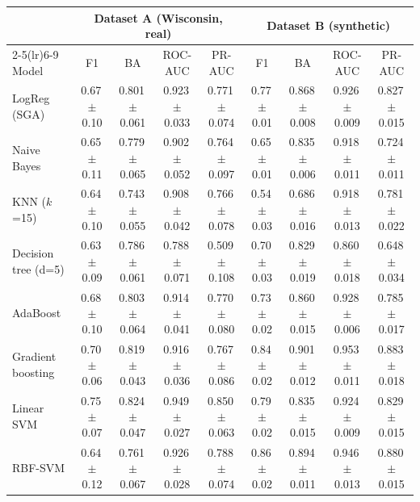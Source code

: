 \begin{tabular}{lcccccccc}\toprule
 & \multicolumn{4}{c}{Dataset A (Wisconsin, real)} & \multicolumn{4}{c}{Dataset B (synthetic)}\\
\cmidrule(lr){2-5}\cmidrule(lr){6-9}
Model & F1 & BA & ROC-AUC & PR-AUC & F1 & BA & ROC-AUC & PR-AUC\\\midrule
LogReg (SGA) & 0.67\,{\scriptsize$\pm$0.10} & 0.801\,{\scriptsize$\pm$0.061} & 0.923\,{\scriptsize$\pm$0.033} & 0.771\,{\scriptsize$\pm$0.074} & 0.77\,{\scriptsize$\pm$0.01} & 0.868\,{\scriptsize$\pm$0.008} & 0.926\,{\scriptsize$\pm$0.009} & 0.827\,{\scriptsize$\pm$0.015}\\
Naive Bayes & 0.65\,{\scriptsize$\pm$0.11} & 0.779\,{\scriptsize$\pm$0.065} & 0.902\,{\scriptsize$\pm$0.052} & 0.764\,{\scriptsize$\pm$0.097} & 0.65\,{\scriptsize$\pm$0.01} & 0.835\,{\scriptsize$\pm$0.006} & 0.918\,{\scriptsize$\pm$0.011} & 0.724\,{\scriptsize$\pm$0.011}\\
KNN ($k$=15) & 0.64\,{\scriptsize$\pm$0.10} & 0.743\,{\scriptsize$\pm$0.055} & 0.908\,{\scriptsize$\pm$0.042} & 0.766\,{\scriptsize$\pm$0.078} & 0.54\,{\scriptsize$\pm$0.03} & 0.686\,{\scriptsize$\pm$0.016} & 0.918\,{\scriptsize$\pm$0.013} & 0.781\,{\scriptsize$\pm$0.022}\\
Decision tree (d=5) & 0.63\,{\scriptsize$\pm$0.09} & 0.786\,{\scriptsize$\pm$0.061} & 0.788\,{\scriptsize$\pm$0.071} & 0.509\,{\scriptsize$\pm$0.108} & 0.70\,{\scriptsize$\pm$0.03} & 0.829\,{\scriptsize$\pm$0.019} & 0.860\,{\scriptsize$\pm$0.018} & 0.648\,{\scriptsize$\pm$0.034}\\
AdaBoost & 0.68\,{\scriptsize$\pm$0.10} & 0.803\,{\scriptsize$\pm$0.064} & 0.914\,{\scriptsize$\pm$0.041} & 0.770\,{\scriptsize$\pm$0.080} & 0.73\,{\scriptsize$\pm$0.02} & 0.860\,{\scriptsize$\pm$0.015} & 0.928\,{\scriptsize$\pm$0.006} & 0.785\,{\scriptsize$\pm$0.017}\\
Gradient boosting & 0.70\,{\scriptsize$\pm$0.06} & 0.819\,{\scriptsize$\pm$0.043} & 0.916\,{\scriptsize$\pm$0.036} & 0.767\,{\scriptsize$\pm$0.086} & 0.84\,{\scriptsize$\pm$0.02} & 0.901\,{\scriptsize$\pm$0.012} & 0.953\,{\scriptsize$\pm$0.011} & 0.883\,{\scriptsize$\pm$0.018}\\
Linear SVM & 0.75\,{\scriptsize$\pm$0.07} & 0.824\,{\scriptsize$\pm$0.047} & 0.949\,{\scriptsize$\pm$0.027} & 0.850\,{\scriptsize$\pm$0.063} & 0.79\,{\scriptsize$\pm$0.02} & 0.835\,{\scriptsize$\pm$0.015} & 0.924\,{\scriptsize$\pm$0.009} & 0.829\,{\scriptsize$\pm$0.015}\\
RBF-SVM & 0.64\,{\scriptsize$\pm$0.12} & 0.761\,{\scriptsize$\pm$0.067} & 0.926\,{\scriptsize$\pm$0.028} & 0.788\,{\scriptsize$\pm$0.074} & 0.86\,{\scriptsize$\pm$0.02} & 0.894\,{\scriptsize$\pm$0.011} & 0.946\,{\scriptsize$\pm$0.013} & 0.880\,{\scriptsize$\pm$0.015}\\
\bottomrule\end{tabular}